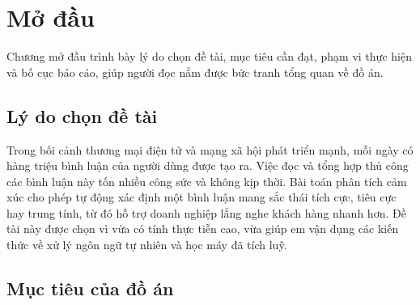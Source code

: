 \chapter{Mở đầu}
\label{ch:modau}

\begin{muctieu}
Chương mở đầu trình bày lý do chọn đề tài, mục tiêu cần đạt, phạm vi thực
hiện và bố cục báo cáo, giúp người đọc nắm được bức tranh tổng quan về đồ án.
\end{muctieu}

\section{Lý do chọn đề tài}

\begin{chuy}
\end{chuy}

\begin{mau}
Trong bối cảnh thương mại điện tử và mạng xã hội phát triển mạnh, mỗi ngày
có hàng triệu bình luận của người dùng được tạo ra. Việc đọc và tổng hợp
thủ công các bình luận này tốn nhiều công sức và không kịp thời. Bài toán
phân tích cảm xúc  cho phép tự động xác định một
bình luận mang sắc thái tích cực, tiêu cực hay trung tính, từ đó hỗ trợ
doanh nghiệp lắng nghe khách hàng nhanh hơn. Đề tài này được chọn vì vừa có
tính thực tiễn cao, vừa giúp em vận dụng các kiến thức về xử lý ngôn ngữ tự
nhiên và học máy đã tích luỹ.
\end{mau}

\section{Mục tiêu của đồ án}

\begin{chuy}
\end{chuy}

